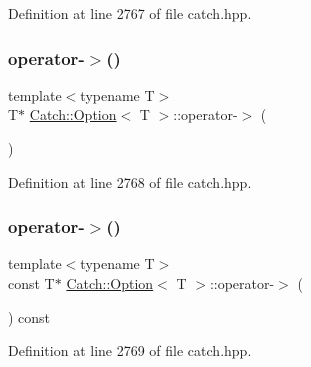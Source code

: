 Definition at line 2767 of file catch.\+hpp.

\hypertarget{class_catch_1_1_option_acad340798a16c8f700f8763119e90f31}{}\label{class_catch_1_1_option_acad340798a16c8f700f8763119e90f31} 
\subsubsection{\texorpdfstring{operator-\/$>$()}{operator->()}\hspace{0.1cm}{\footnotesize\ttfamily [1/2]}}
{\footnotesize\ttfamily template$<$typename T$>$ \\
T$\ast$ \hyperlink{class_catch_1_1_option}{Catch\+::\+Option}$<$ T $>$\+::operator-\/$>$ (\begin{DoxyParamCaption}{ }\end{DoxyParamCaption})\hspace{0.3cm}{\ttfamily [inline]}}



Definition at line 2768 of file catch.\+hpp.

\hypertarget{class_catch_1_1_option_ae8343cbc36dbb95b2dce333d2a6fdc28}{}\label{class_catch_1_1_option_ae8343cbc36dbb95b2dce333d2a6fdc28} 
\subsubsection{\texorpdfstring{operator-\/$>$()}{operator->()}\hspace{0.1cm}{\footnotesize\ttfamily [2/2]}}
{\footnotesize\ttfamily template$<$typename T$>$ \\
const T$\ast$ \hyperlink{class_catch_1_1_option}{Catch\+::\+Option}$<$ T $>$\+::operator-\/$>$ (\begin{DoxyParamCaption}{ }\end{DoxyParamCaption}) const\hspace{0.3cm}{\ttfamily [inline]}}



Definition at line 2769 of file catch.\+hpp.

\hypertarget{class_catch_1_1_option_a78c65b15dd6b2fbd04c5012c43017c8f}{}\label{class_catch_1_1_option_a78c65b15dd6b2fbd04c5012c43017c8f} 

